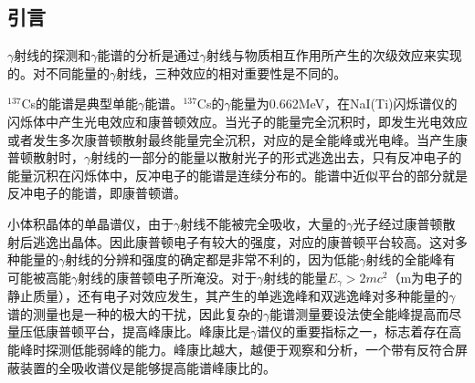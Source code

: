 \documentclass[a4paper,10.0pt,twoside]{npr}
\begin{document}
\begin{multicols}{2}

\section{引言}    %
\vspace*{-1mm}
\song\wuhao

$\gamma$射线的探测和$\gamma$能谱的分析是通过$\gamma$射线与物质相互作用所产生的次级效应来实现的。对不同能量的$\gamma$射线，三种效应的相对重要性是不同的。

$^{137}$Cs的能谱是典型单能$\gamma$能谱。$^{137}$Cs的$\gamma$能量为0.662MeV，在NaI(Ti)闪烁谱仪的闪烁体中产生光电效应和康普顿效应。当光子的能量完全沉积时，即发生光电效应或者发生多次康普顿散射最终能量完全沉积，对应的是全能峰或光电峰。当产生康普顿散射时，$\gamma$射线的一部分的能量以散射光子的形式逃逸出去，只有反冲电子的能量沉积在闪烁体中，反冲电子的能谱是连续分布的。能谱中近似平台的部分就是反冲电子的能谱，即康普顿谱。

小体积晶体的单晶谱仪，由于$\gamma$射线不能被完全吸收，大量的$\gamma$光子经过康普顿散射后逃逸出晶体。因此康普顿电子有较大的强度，对应的康普顿平台较高。这对多种能量的$\gamma$射线的分辨和强度的确定都是非常不利的，因为低能$\gamma$射线的全能峰有可能被高能$\gamma$射线的康普顿电子所淹没。对于$\gamma$射线的能量$E_{\gamma}>2mc^2$（m为电子的静止质量），还有电子对效应发生，其产生的单逃逸峰和双逃逸峰对多种能量的$\gamma$谱的测量也是一种的极大的干扰，因此复杂的$\gamma$能谱测量要设法使全能峰提高而尽量压低康普顿平台，提高峰康比。峰康比是$\gamma$谱仪的重要指标之一，标志着存在高能峰时探测低能弱峰的能力。峰康比越大，越便于观察和分析，一个带有反符合屏蔽装置的全吸收谱仪是能够提高能谱峰康比的。


\end{multicols}
\end{document}
